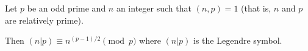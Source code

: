 \documentclass[12pt]{article}
\begin{document}
Let $p$ be an odd prime and $n$ an integer such that $(n,p)=1$ (that is, $n$ and $p$ are relatively prime).

Then $(n|p)\equiv n^{(p-1)/2}\pmod{p}$ where $(n|p)$ is the Legendre symbol.
\end{document}
